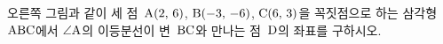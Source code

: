\noindent\begin{minipage}[t]{0.58\linewidth}\vspace{0pt}\raggedright 오른쪽 그림과 같이 세 점~$\mathrm{A}(2,\mkern3mu 6)$, $\mathrm{B}(-3,\mkern3mu -6)$, $\mathrm{C}(6,\mkern3mu 3)$을 꼭짓점으로 하는 삼각형~$\mathrm{ABC}$에서 $\angle\mathrm{A}$의 이등분선이 변~$\mathrm{BC}$와 만나는 점~$\mathrm{D}$의 좌표를 구하시오.\end{minipage}\hfill\begin{minipage}[t]{0.4\linewidth}\vspace{0pt}\centering \resizebox{\ifdim\width>\linewidth\linewidth\else\width\fi}{!}{}\end{minipage}\par
